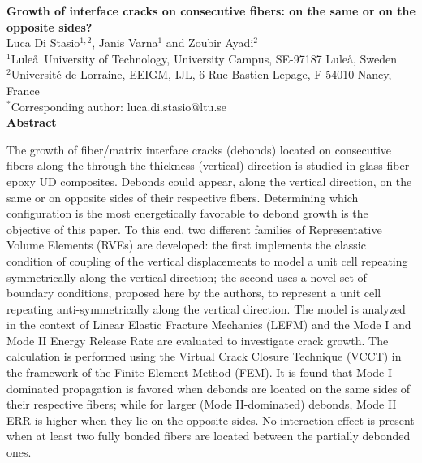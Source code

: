 \thispagestyle{plain}
\begin{center}
\Large\textbf{Growth of interface cracks on consecutive fibers: on the same or on the opposite sides?}\\
\vspace{10mm}
\normalsize Luca Di Stasio$^{1,2}$, Janis Varna$^{1}$ and Zoubir Ayadi$^{2}$\\
\vspace{5mm}
\normalsize $^{1}$Lule\aa\ University of Technology, University Campus, SE-97187 Lule\aa, Sweden\\
\normalsize $^{2}$Universit\'e de Lorraine, EEIGM, IJL, 6 Rue Bastien Lepage, F-54010 Nancy, France\\
\vspace{5mm}
\normalsize $^{*}$Corresponding author: luca.di.stasio@ltu.se\\
\vspace{15mm}
\textbf{Abstract}\\
\end{center}

The growth of fiber/matrix interface cracks (debonds) located on consecutive fibers along the through-the-thickness (vertical) direction is studied in glass fiber-epoxy UD composites. Debonds could appear, along the vertical direction, on the same or on opposite sides of their respective fibers. Determining which configuration is the most energetically favorable to debond growth is the objective of this paper. To this end, two different families of Representative Volume Elements (RVEs) are developed: the first implements the classic condition of coupling of the vertical displacements to model a unit cell repeating symmetrically along the vertical direction; the second uses a novel set of boundary conditions, proposed here by the authors, to represent a unit cell repeating anti-symmetrically along the vertical direction. The model is analyzed in the context of Linear Elastic Fracture Mechanics (LEFM) and the Mode I and Mode II Energy Release Rate are evaluated to investigate crack growth. The calculation is performed using the Virtual Crack Closure Technique (VCCT) in the framework of the Finite Element Method (FEM). It is found that Mode I dominated propagation is favored when debonds are located on the same sides of their respective fibers; while for larger (Mode II-dominated) debonds, Mode II ERR is higher when they lie on the opposite sides. No interaction effect is present when at least two fully bonded fibers are located between the partially debonded ones.

